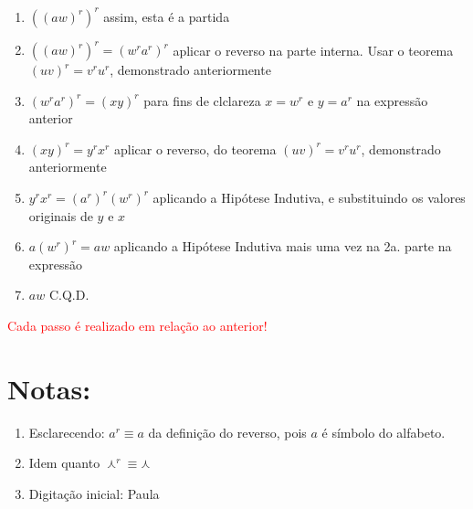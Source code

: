 \documentclass[a4paper,12pt]{article}
\begin{document}
	\begin{enumerate}

    \item $((aw)^r)^r$ \hspace{2cm} assim, esta é a partida
		
    \item$((aw)^r)^r = (w^ra^r)^r$ \hspace{2cm} aplicar o reverso na parte interna. Usar o teorema $(uv)^r=v^ru^r$, demonstrado anteriormente
		 
	 \item$(w^ra^r)^r = (xy)^r$ \hspace{2cm}  para fins de clclareza	 $x=w^r$ e $y=a^r$ na expressão anterior
		
	\item $(xy)^r = y^rx^r$ \hspace{2cm} aplicar o reverso, do teorema $(uv)^r=v^ru^r$, demonstrado anteriormente
		
				 
	 \item $ y^rx^r=(a^r)^r(w^r)^r$ \hspace{2cm} aplicando a Hipótese Indutiva, e substituindo os valores originais de $y$ e $x$
		 
	 \item $a(w^r)^r = aw$ \hspace{2cm} aplicando a Hipótese Indutiva mais uma vez na 2a. parte na expressão 
		
	\item $aw$ \hspace{2cm} C.Q.D.
		
\end{enumerate}

\textcolor{red}{Cada passo é realizado em relação ao anterior!}  
	


\section{Notas:}
\begin{enumerate}

		 \item Esclarecendo: $a^r \equiv a$ da definição do reverso, pois $a$ é símbolo do alfabeto. 
		 
		 \item Idem quanto $\curlywedge ^r \equiv \curlywedge$
		 
		 \item Digitação inicial: Paula
		 
	
\end{enumerate}
\end{document}
